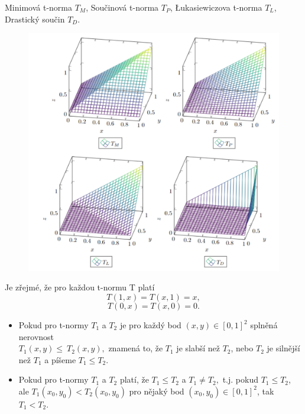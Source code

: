 \begin{graph} Minimová t-norma $T_M$, Součinová t-norma $T_P$, Łukasiewiczova t-norma $T_L$, Drastický součin $T_D$.
   \begin{figure}[H]
    \hspace{-1cm}
        \includegraphics[scale=0.7]{template-fig/t_normy.pdf}
        \centering
    \end{figure}
\end{graph}

\begin{remark}
    Je zřejmé, že pro každou t-normu T platí
    $$T(1,x)=T(x,1)=x,$$
    $$T(0,x)=T(x,0)=0.$$
\end{remark}
\begin{definition}
\cite{KMP}
    \begin{itemize}
        \item Pokud pro t-normy $T_1$ a $T_2$ je
        pro každý bod $(x,y) \in [0,1]^2$ splněná nerovnost\\
        $T_1(x,y)\leq ~T_2(x,y),$ znamená to, že $T_1$ je slabší než $T_2$,
        nebo $T_2$ je silnější než $T_1$ a píšeme $T_1\leq T_2$.
        \item  Pokud pro t-normy $T_1$ a $T_2$ platí, že $T_1 \leq T_2$ a
        $T_1 \ne T_2,$ t.j. pokud $T_1 \leq T_2$, ale $T_1(x_0,y_0) <
        T_2(x_0,y_0)$ pro nějaký bod $(x_0,y_0) \in [0,1]^2$, tak $T_1<T_2$.
    \end{itemize}
\end{definition}


